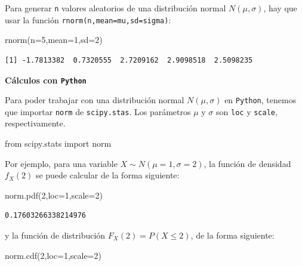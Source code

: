 \documentclass[
  letterpaper,
  DIV=11,
  numbers=noendperiod]{scrreprt}
\newenvironment{Shaded}{\begin{snugshade}}{\end{snugshade}}
\newcommand{\AttributeTok}[1]{\textcolor[rgb]{0.40,0.45,0.13}{#1}}
\newcommand{\DecValTok}[1]{\textcolor[rgb]{0.68,0.00,0.00}{#1}}
\newcommand{\FunctionTok}[1]{\textcolor[rgb]{0.28,0.35,0.67}{#1}}
\newcommand{\ImportTok}[1]{\textcolor[rgb]{0.00,0.46,0.62}{#1}}
\newcommand{\NormalTok}[1]{\textcolor[rgb]{0.00,0.23,0.31}{#1}}
\newcommand{\OperatorTok}[1]{\textcolor[rgb]{0.37,0.37,0.37}{#1}}
\begin{document}
Para generar \texttt{n} valores aleatorios de una distribución normal
\(N(\mu,\sigma)\), hay que usar la función
\texttt{rnorm(n,mean=mu,sd=sigma)}:

\begin{Shaded}
\begin{Highlighting}[]
\FunctionTok{rnorm}\NormalTok{(}\AttributeTok{n=}\DecValTok{5}\NormalTok{,}\AttributeTok{mean=}\DecValTok{1}\NormalTok{,}\AttributeTok{sd=}\DecValTok{2}\NormalTok{)}
\end{Highlighting}
\end{Shaded}

\begin{verbatim}
[1] -1.7813382  0.7320555  2.7209162  2.9098518  2.5098235
\end{verbatim}

\textbf{Cálculos con \texttt{Python}}

Para poder trabajar con una distribución normal \(N(\mu,\sigma)\) en
\texttt{Python}, tenemos que importar \texttt{norm} de
\texttt{scipy.stas}. Los parámetros \(\mu\) y \(\sigma\) son
\texttt{loc} y \texttt{scale}, respectivamente.

\begin{Shaded}
\begin{Highlighting}[]
\ImportTok{from}\NormalTok{ scipy.stats }\ImportTok{import}\NormalTok{ norm}
\end{Highlighting}
\end{Shaded}

Por ejemplo, para una variable \(X\sim N(\mu=1,\sigma=2)\), la función
de densidad \(f_X(2)\) se puede calcular de la forma siguiente:

\begin{Shaded}
\begin{Highlighting}[]
\NormalTok{norm.pdf(}\DecValTok{2}\NormalTok{,loc}\OperatorTok{=}\DecValTok{1}\NormalTok{,scale}\OperatorTok{=}\DecValTok{2}\NormalTok{)}
\end{Highlighting}
\end{Shaded}

\begin{verbatim}
0.17603266338214976
\end{verbatim}

y la función de distribución \(F_X(2) = P(X\leq 2)\), de la forma
siguiente:

\begin{Shaded}
\begin{Highlighting}[]
\NormalTok{norm.cdf(}\DecValTok{2}\NormalTok{,loc}\OperatorTok{=}\DecValTok{1}\NormalTok{,scale}\OperatorTok{=}\DecValTok{2}\NormalTok{)}
\end{Highlighting}
\end{Shaded}
\end{document}
